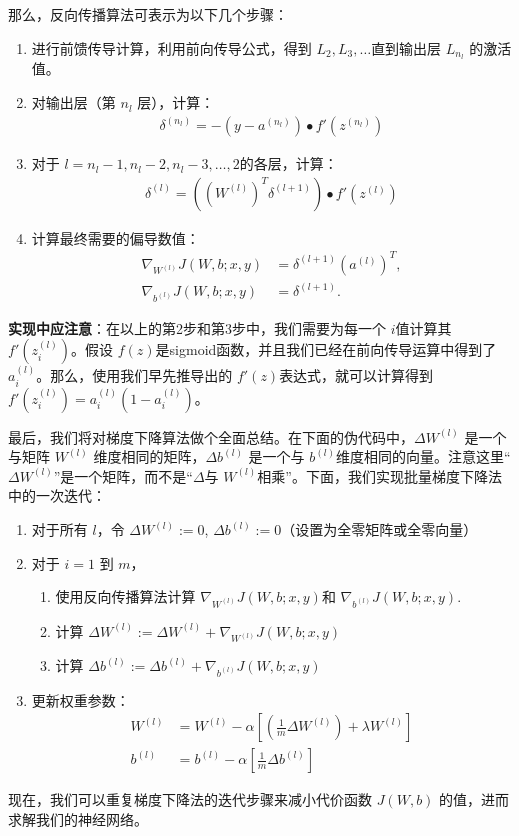 那么，反向传播算法可表示为以下几个步骤：
\begin{enumerate}
\item
进行前馈传导计算，利用前向传导公式，得到 $ L_2, L_3, \ldots$直到输出层 $ L_{n_l}$ 的激活值。
\item
对输出层（第 $ n_l$ 层），计算：
 \begin{align}
\delta^{(n_l)}
= - (y - a^{(n_l)}) \bullet f'(z^{(n_l)})
\nonumber \end{align}
\item
对于 $ l = n_l-1, n_l-2, n_l-3, \ldots, 2 $的各层，计算：
 \begin{align}
\delta^{(l)} = \left((W^{(l)})^T \delta^{(l+1)}\right) \bullet f'(z^{(l)})
\nonumber \end{align}
\item
计算最终需要的偏导数值：
 \begin{align}
\nabla_{W^{(l)}} J(W,b;x,y) &= \delta^{(l+1)} (a^{(l)})^T, \nonumber \\
\nabla_{b^{(l)}} J(W,b;x,y) &= \delta^{(l+1)}.
\nonumber \end{align}
\end{enumerate}
\textbf{实现中应注意}：在以上的第2步和第3步中，我们需要为每一个 $ i $值计算其 $ f'(z^{(l)}_i)$。假设 $ f(z) $是sigmoid函数，并且我们已经在前向传导运算中得到了 $ a^{(l)}_i$。那么，使用我们早先推导出的 $ f'(z)$表达式，就可以计算得到 $ f'(z^{(l)}_i) = a^{(l)}_i (1- a^{(l)}_i)$。

最后，我们将对梯度下降算法做个全面总结。在下面的伪代码中，$ \Delta W^{(l)}$ 是一个与矩阵 $ W^{(l)}$ 维度相同的矩阵，$ \Delta b^{(l)}$ 是一个与 $ b^{(l)} $维度相同的向量。注意这里“$ \Delta W^{(l)}$”是一个矩阵，而不是“$ \Delta $与 $ W^{(l)} $相乘”。下面，我们实现批量梯度下降法中的一次迭代：
\begin{enumerate}
\item
对于所有 $ l$，令 $ \Delta W^{(l)} := 0 $,  $ \Delta b^{(l)} := 0 $（设置为全零矩阵或全零向量）
\item
对于 $ i = 1$ 到 $ m$，
\begin{enumerate}
\item 使用反向传播算法计算 $ \nabla_{W^{(l)}} J(W,b;x,y) $和 $ \nabla_{b^{(l)}} J(W,b;x,y)$.
\item 计算 $ \Delta W^{(l)} := \Delta W^{(l)} + \nabla_{W^{(l)}} J(W,b;x,y)$
\item 计算 $ \Delta b^{(l)} := \Delta b^{(l)} + \nabla_{b^{(l)}} J(W,b;x,y)$
\end{enumerate}
\item 更新权重参数：
 \begin{align}
W^{(l)} &= W^{(l)} - \alpha \left[ \left(\frac{1}{m} \Delta W^{(l)} \right) + \lambda W^{(l)}\right] \nonumber \\
b^{(l)} &= b^{(l)} - \alpha \left[\frac{1}{m} \Delta b^{(l)}\right]
\nonumber \end{align}
\end{enumerate}
现在，我们可以重复梯度下降法的迭代步骤来减小代价函数 $ J(W,b)$ 的值，进而求解我们的神经网络。



